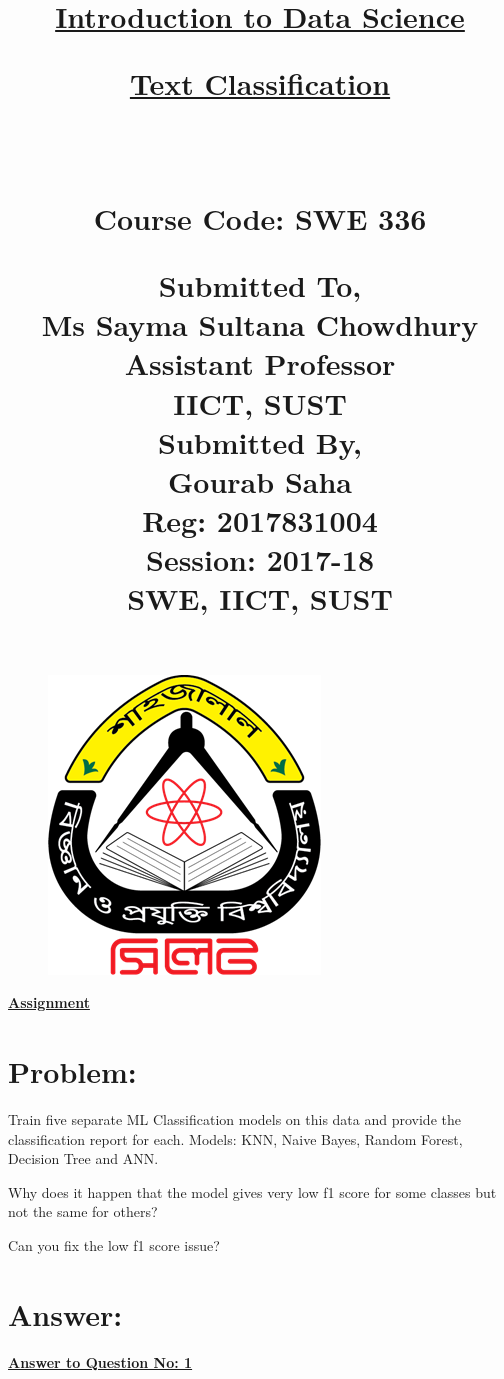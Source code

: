 \documentclass[11pt]{article}
\title{
\begin{center}
\begin{Large}
{
\bf  \underline{Introduction to Data Science}
\bf

\bf  \underline{Text Classification}
}
\end{Large}\\[0.1 cm]
\begin{Large}
{\large {\bf Course Code: SWE 336}}\\[1 cm]
\end{Large}
{\large {\bf Submitted To,}}\\
{\large Ms Sayma Sultana Chowdhury}\\
{\large Assistant Professor}\\
{\large IICT, SUST}\\[1 cm]

{\large {\bf Submitted By,}}\\
{\large Gourab Saha}\\
{\large Reg: 2017831004}\\
{\large Session: 2017-18}\\
{\large SWE, IICT, SUST}\\
\end{center}
}
\begin{document}
\begin{figure}
\centering
\includegraphics[scale=.5]{sust}
\label{fig:Shahjalal University of Science and Technology}
\end{figure}

\maketitle
\newpage




\begin{center}
\bf  \underline{Assignment}
\end{center}


\section*{Problem:}

\begin{enumerate}
\bf{
\item{ Train five separate ML Classification models on this data and provide the classification report for each. Models: KNN, Naive Bayes, Random Forest, Decision Tree and ANN.}


\item{Why does it happen that the model gives very low f1 score for some classes but not the same for others?}


\item{Can you fix the low f1 score issue?}
}
\end{enumerate}
 
\section*{Answer:}

\begin{center}
\bf  \underline{Answer to Question No: 1} \\
\end{center} 
\end{document}

